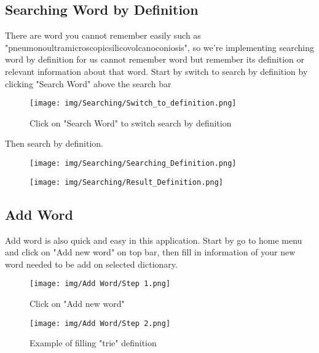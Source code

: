 \documentclass[sn-mathphys,Numbered]{sn-jnl}%
\begin{document}
\subsection{Searching Word by Definition}

There are word you cannot remember easily such as "pneumonoultramicroscopicsilicovolcanoconiosis", so we're implementing searching word by definition for us cannot remember word but remember its definition or relevant information about that word. Start by switch to search by definition by clicking "Search Word" above the search bar

\begin{figure}[H]
	\centering
	\texttt{[image: img/Searching/Switch\_to\_definition.png]}
	\caption*{Click on "Search Word" to switch search by definition}
\end{figure}

Then search by definition.

\begin{figure}[!htb]
	\centering
	\begin{minipage}{0.49\textwidth}
		\texttt{[image: img/Searching/Searching\_Definition.png]}
	\end{minipage}\hfill
	\begin{minipage}{0.49\textwidth}
		\texttt{[image: img/Searching/Result\_Definition.png]}
	\end{minipage}
\end{figure}

\subsection{Add Word}
Add word is also quick and easy in this application. Start by go to home menu and click on "Add new word" on top bar, then fill in information of your new word needed to be add on selected dictionary.

\begin{figure}[!htb]
	\centering
	\begin{minipage}{0.49\textwidth}
		\texttt{[image: img/Add Word/Step 1.png]}
		\caption*{Click on "Add new word"}
	\end{minipage}\hfill
	\begin{minipage}{0.49\textwidth}
		\texttt{[image: img/Add Word/Step 2.png]}
		\caption*{Example of filling "trie" definition}
	\end{minipage}
\end{figure}
\end{document}
